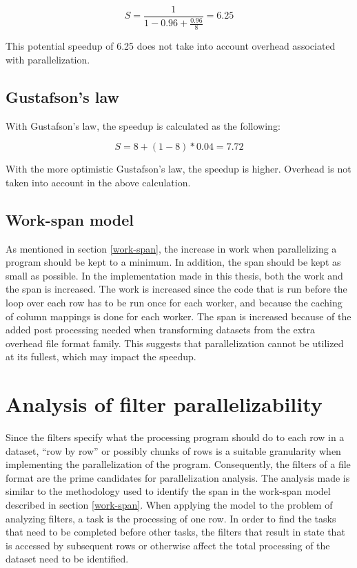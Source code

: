 \begin{displaymath}
  S = \frac{1}{1 - 0.96 + \frac{0.96}{8}} = 6.25
  \label{fig:amdahl_calculation}
\end{displaymath}

\noindent This potential speedup of 6.25 does not take into account overhead associated with parallelization.

\subsection{Gustafson's law}
With Gustafson's law, the speedup is calculated as the following:

\begin{displaymath}
  S = 8 + (1-8) * 0.04 = 7.72
\end{displaymath}

\noindent With the more optimistic Gustafson's law, the speedup is higher. Overhead is not taken into account in the above calculation.

\subsection{Work-span model}
As mentioned in section \ref{work-span}, the increase in work when parallelizing a program should be kept to a minimum.
In addition, the span should be kept as small as possible. In the implementation made in this thesis, both the work and the span is increased.
The work is increased since the code that is run before the loop over each row has to be run once for each worker, and because the caching of
column mappings is done for each worker. The span is increased because of the added post processing needed when transforming datasets from the
extra overhead file format family. This suggests that parallelization cannot be utilized at its fullest, which may impact the speedup.

\section{Analysis of filter parallelizability}
Since the filters specify what the processing program should do to each row in a dataset, ``row by row'' or possibly chunks of rows is a suitable
granularity when implementing the parallelization of the program. Consequently, the filters of a file format are the prime candidates
for parallelization analysis. The analysis made is similar to the methodology used to identify the span in the work-span model described in
section \ref{work-span}. When applying the model to the problem of analyzing filters, a task is the processing of one row. In order to find
the tasks that need to be completed before other tasks, the filters that result in state that is accessed by subsequent rows or otherwise
affect the total processing of the dataset need to be identified.

